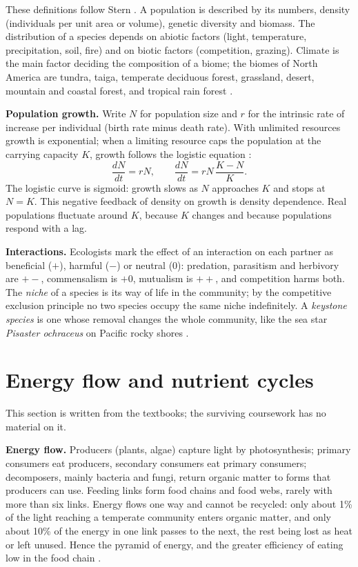 These definitions follow Stern
\cite[Chapters 25 and 26]{stern2008plant}.
A population is described by its numbers,
density (individuals per unit area or
volume), genetic diversity and biomass. The
distribution of a species depends on abiotic
factors (light, temperature, precipitation,
soil, fire) and on biotic factors
(competition, grazing). Climate is the main
factor deciding the composition of a biome;
the biomes of North America are tundra,
taiga, temperate deciduous forest,
grassland, desert, mountain and coastal
forest, and tropical rain forest
\cite[Chapter 26]{stern2008plant}.

\textbf{Population growth.}
Write $N$ for population size and $r$ for
the intrinsic rate of increase per
individual (birth rate minus death rate).
With unlimited resources growth is
exponential; when a limiting resource caps
the population at the carrying capacity
$K$, growth follows the logistic equation
\cite[Chapter 2]{hickman2002animal}:
$$
\frac{dN}{dt} = rN, \qquad
\frac{dN}{dt} = rN\,\frac{K-N}{K}.
$$
The logistic curve is sigmoid: growth slows
as $N$ approaches $K$ and stops at $N=K$.
This negative feedback of density on growth
is density dependence. Real populations
fluctuate around $K$, because $K$ changes and
because populations respond with a lag.

\textbf{Interactions.}
Ecologists mark the effect of an
interaction on each partner as beneficial
($+$), harmful ($-$) or neutral ($0$):
predation, parasitism and herbivory are
$+-$, commensalism is $+0$, mutualism is
$++$, and competition harms both. The
\emph{niche} of a species is its way of life
in the community; by the competitive
exclusion principle no two species occupy
the same niche indefinitely. A
\emph{keystone species} is one whose removal
changes the whole community, like the sea
star \emph{Pisaster ochraceus} on Pacific
rocky shores
\cite[Chapter 2]{hickman2002animal}.

\section{Energy flow and nutrient cycles}
\label{section-energy-cycles}

This section is written from the textbooks;
the surviving coursework has no material on
it.

\textbf{Energy flow.}
Producers (plants, algae) capture light by
photosynthesis; primary consumers eat
producers, secondary consumers eat primary
consumers; decomposers, mainly bacteria and
fungi, return organic matter to forms that
producers can use. Feeding links form food
chains and food webs, rarely with more than
six links. Energy flows one way and cannot
be recycled: only about 1\% of the light
reaching a temperate community enters
organic matter, and only about 10\% of the
energy in one link passes to the next, the
rest being lost as heat or left unused.
Hence the pyramid of energy, and the
greater efficiency of eating low in the
food chain
\cite[Chapter 25]{stern2008plant}.

